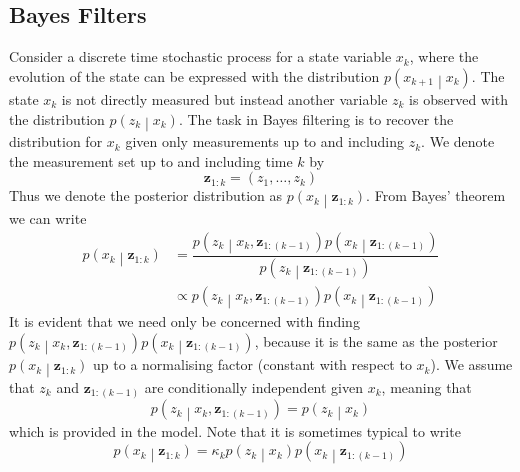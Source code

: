 \documentclass[11pt]{report} %
\begin{document}
\subsection{Bayes Filters \cite{Thrun2005, Brown2012}}

Consider a discrete time stochastic process for a state variable $x_{k}$, where the evolution of the state can be expressed with the distribution $p\left(x_{k + 1}\middle|x_{k}\right)$. The state $x_{k}$ is not directly measured but instead another variable $z_{k}$ is observed with the distribution $p\left(z_{k}\middle|x_{k}\right)$. The task in Bayes filtering is to recover the distribution for $x_{k}$ given only measurements up to and including $z_{k}$. We denote the measurement set up to and including time $k$ by
\begin{equation}
\mathbf{z}_{1:k} = \left(z_{1}, \dots, z_{k}\right)
\end{equation}
Thus we denote the posterior distribution as $p\left(x_{k}\middle|\mathbf{z}_{1:k}\right)$. From Bayes' theorem we can write
\begin{align}
p\left(x_{k}\middle|\mathbf{z}_{1:k}\right) &= \dfrac{p\left(z_{k}\middle|x_{k}, \mathbf{z}_{1:\left(k - 1\right)}\right)p\left(x_{k}\middle|\mathbf{z}_{1:\left(k - 1\right)}\right)}{p\left(z_{k}\middle|\mathbf{z}_{1:\left(k - 1\right)}\right)} \\
&\propto p\left(z_{k}\middle|x_{k}, \mathbf{z}_{1:\left(k - 1\right)}\right)p\left(x_{k}\middle|\mathbf{z}_{1:\left(k - 1\right)}\right)
\end{align}
It is evident that we need only be concerned with finding $p\left(z_{k}\middle|x_{k}, \mathbf{z}_{1:\left(k - 1\right)}\right)p\left(x_{k}\middle|\mathbf{z}_{1:\left(k - 1\right)}\right)$, because it is the same as the posterior $p\left(x_{k}\middle|\mathbf{z}_{1:k}\right)$ up to a normalising factor (constant with respect to $x_{k}$). We assume that $z_{k}$ and $\mathbf{z}_{1:\left(k - 1\right)}$ are conditionally independent given $x_{k}$, meaning that
\begin{equation}
p\left(z_{k}\middle|x_{k}, \mathbf{z}_{1:\left(k - 1\right)}\right) = p\left(z_{k}\middle|x_{k}\right)
\end{equation}
which is provided in the model. Note that it is sometimes typical to write
\begin{equation}
p\left(x_{k}\middle|\mathbf{z}_{1:k}\right) = \kappa_{k} p\left(z_{k}\middle|x_{k}\right)p\left(x_{k}\middle|\mathbf{z}_{1:\left(k - 1\right)}\right)
\end{equation}
\end{document}
